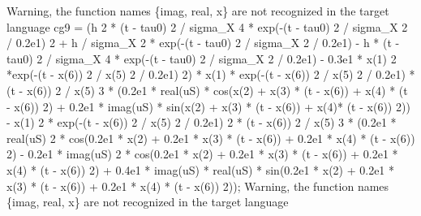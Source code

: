 \begin{maplegroup}
\underline{}Warning, the function names \{imag, real, x\} are not recognized in the target language\underline{}\mapleresult
cg9 = (h  2 * (t - tau0)  2 / sigma\_X  4 * exp(-(t - tau0)  2 / sigma\_X  2 / 0.2e1)  2 + h / sigma\_X  2 * exp(-(t - tau0)  2 / sigma\_X  2 / 0.2e1) - h * (t - tau0)  2 / sigma\_X  4 * exp(-(t - tau0)  2 / sigma\_X  2 / 0.2e1) - 0.3e1 * x(1)  2 *exp(-(t - x(6))  2 / x(5)  2 / 0.2e1)  2) * x(1) * exp(-(t - x(6))  2 / x(5)  2 / 0.2e1) * (t - x(6))  2 / x(5)  3 * (0.2e1 * real(uS) * cos(x(2) + x(3) * (t - x(6)) + x(4) * (t - x(6))  2) + 0.2e1 * imag(uS) * sin(x(2) + x(3) * (t - x(6)) + x(4)* (t - x(6))  2)) - x(1)  2 * exp(-(t - x(6))  2 / x(5)  2 / 0.2e1)  2 * (t - x(6))  2 / x(5)  3 * (0.2e1 * real(uS)  2 * cos(0.2e1 * x(2) + 0.2e1 * x(3) * (t - x(6)) + 0.2e1 * x(4) * (t - x(6))  2) - 0.2e1 * imag(uS)  2 * cos(0.2e1 * x(2) + 0.2e1 * x(3) * (t - x(6)) + 0.2e1 * x(4) * (t - x(6))  2) + 0.4e1 * imag(uS) * real(uS) * sin(0.2e1 * x(2) + 0.2e1 * x(3) * (t - x(6)) + 0.2e1 * x(4) * (t - x(6))  2));
\underline{}Warning, the function names \{imag, real, x\} are not recognized in the target language\underline{}\mapleresult

\end{maplegroup}
